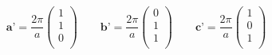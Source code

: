$$
\textbf{a'}= \frac{2\pi}{a} \left(\begin{matrix}1\\1\\0\\ \end{matrix}\right)	\qquad
\textbf{b'}= \frac{2\pi}{a} \left(\begin{matrix}0\\1\\1\\ \end{matrix}\right)	\qquad
\textbf{c'}= \frac{2\pi}{a} \left(\begin{matrix}1\\0\\1\\ \end{matrix}\right)	
$$